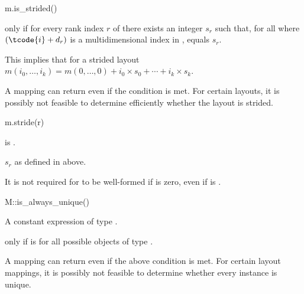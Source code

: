 \begin{itemdecl}
m.is_strided()
\end{itemdecl}

\begin{itemdescr}
\pnum
\result
{}

\pnum
\returns
{} only if
for every rank index $r$ of  there exists an integer $s_r$
such that,
for all  where $(\tcode{i}+d_r)$ is
a multidimensional index in ,
 equals $s_r$.
\begin{note}
This implies that for a strided layout
$m(i_0, \dotsc, i_k) = m(0, \dotsc, 0) + i_0 \times s_0 + \dotsb + i_k \times s_k$.
\end{note}
\begin{note}
A mapping can return  even if the condition is met.
For certain layouts, it is possibly not feasible to determine efficiently
whether the layout is strided.
\end{note}
\end{itemdescr}

\begin{itemdecl}
m.stride(r)
\end{itemdecl}

\begin{itemdescr}
\pnum
\expects
{} is .

\pnum
\result
{}

\pnum
\returns
$s_r$ as defined in  above.

\pnum
\begin{note}
It is not required for  to be well-formed
if  is zero,
even if  is .
\end{note}
\end{itemdescr}

\begin{itemdecl}
M::is_always_unique()
\end{itemdecl}

\begin{itemdescr}
\pnum
\result
A constant expression of type .

\pnum
\returns
{} only if  is 
for all possible objects  of type .
\begin{note}
A mapping can return  even if the above condition is met.
For certain layout mappings, it is possibly not feasible to determine
whether every instance is unique.
\end{note}
\end{itemdescr}

